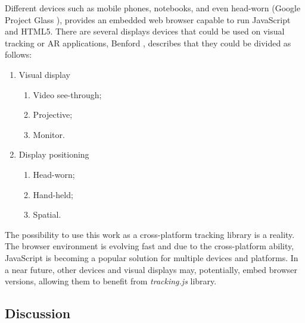 Different devices such as mobile phones, notebooks, and even head-worn \cite{Benford1998} (Google Project Glass \cite{Glass2013}), provides an embedded web browser capable to run JavaScript and HTML5. There are several displays devices that could be used on visual tracking or AR applications, Benford \cite{Benford1998}, describes that they could be divided as follows:

\begin{enumerate}
  \item Visual display
    \begin{enumerate}
      \item Video see-through;
      \item Projective;
      \item Monitor.
    \end{enumerate}

  \item Display positioning
    \begin{enumerate}
      \item Head-worn;
      \item Hand-held;
      \item Spatial.
    \end{enumerate}
\end{enumerate}

The possibility to use this work as a cross-platform tracking library is a reality. The browser environment is evolving fast and due to the cross-platform ability, JavaScript is becoming a popular solution for multiple devices and platforms. In a near future, other devices and visual displays may, potentially, embed browser versions, allowing them to benefit from \textit{tracking.js} library.


\subsection{Discussion} %
\label{sub:basic_concepts:visual_tracking:discussion}

